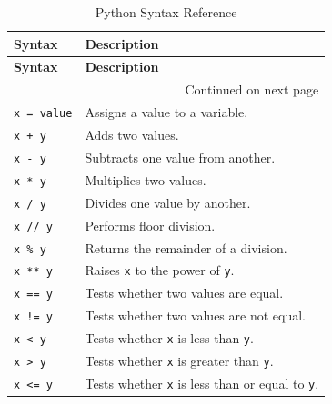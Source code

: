 \documentclass[11pt]{book}
\begin{document}
\begin{longtable}{p{} p{}}
    \caption{Python Syntax Reference}
    \label{tab:python-syntax-reference} \\

    \toprule
    \textbf{Syntax} & \textbf{Description} \\
    \midrule
    \endfirsthead

    \toprule
    \textbf{Syntax} & \textbf{Description} \\
    \midrule
    \endhead

    \midrule
    \multicolumn{2}{r}{Continued on next page} \\
    \endfoot

    \bottomrule
    \endlastfoot

    \texttt{x = value} &
    Assigns a value to a variable. \\

    \texttt{x + y} &
    Adds two values. \\

    \texttt{x - y} &
    Subtracts one value from another. \\

    \texttt{x * y} &
    Multiplies two values. \\

    \texttt{x / y} &
    Divides one value by another. \\

    \texttt{x // y} &
    Performs floor division. \\

    \texttt{x \% y} &
    Returns the remainder of a division. \\

    \texttt{x ** y} &
    Raises \texttt{x} to the power of \texttt{y}. \\

    \texttt{x == y} &
    Tests whether two values are equal. \\

    \texttt{x != y} &
    Tests whether two values are not equal. \\

    \texttt{x < y} &
    Tests whether \texttt{x} is less than \texttt{y}. \\

    \texttt{x > y} &
    Tests whether \texttt{x} is greater than \texttt{y}. \\

    \texttt{x <= y} &
    Tests whether \texttt{x} is less than or equal to \texttt{y}. \\


\end{longtable}
\end{document}
